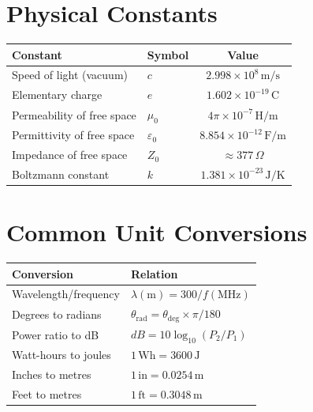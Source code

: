 \section*{Physical Constants}
\begin{center}
\renewcommand{\arraystretch}{1.15}
\begin{tabular}{@{}llc@{}}
\toprule
Constant & Symbol & Value \\
\midrule
Speed of light (vacuum) & $c$ & $2.998\times10^{8}\,\text{m/s}$ \\
Elementary charge & $e$ & $1.602\times10^{-19}\,\text{C}$ \\
Permeability of free space & $\mu_0$ & $4\pi\times10^{-7}\,\text{H/m}$ \\
Permittivity of free space & $\varepsilon_0$ & $8.854\times10^{-12}\,\text{F/m}$ \\
Impedance of free space & $Z_0$ & $\approx 377\,\Omega$ \\
Boltzmann constant & $k$ & $1.381\times10^{-23}\,\text{J/K}$ \\
\bottomrule
\end{tabular}
\end{center}

\section*{Common Unit Conversions}
\begin{center}
\renewcommand{\arraystretch}{1.15}
\begin{tabular}{@{}ll@{}}
\toprule
Conversion & Relation \\
\midrule
Wavelength/frequency & $\lambda(\text{m}) = 300 / f(\text{MHz})$ \\
Degrees to radians & $\theta_{\text{rad}} = \theta_{\text{deg}}\times\pi/180$ \\
Power ratio to dB & $dB = 10\log_{10}(P_2/P_1)$ \\
Watt-hours to joules & $1\,\text{Wh} = 3600\,\text{J}$ \\
Inches to metres & $1\,\text{in} = 0.0254\,\text{m}$ \\
Feet to metres & $1\,\text{ft} = 0.3048\,\text{m}$ \\
\bottomrule
\end{tabular}
\end{center}

